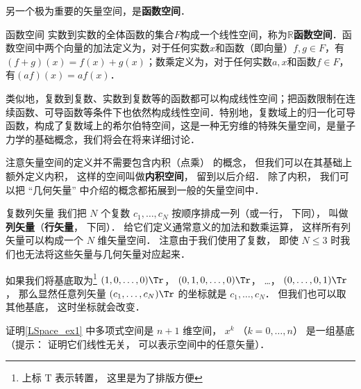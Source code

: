 另一个极为重要的矢量空间，是\textbf{函数空间}．

\begin{example}{函数空间}
实数到实数的全体函数的集合$F$构成一个线性空间，称为$\mathbb{R}$\textbf{函数空间}．函数空间中两个向量的加法定义为，对于任何实数$x$和函数（即向量）$f, g\in F$，有$(f+g)(x)=f(x)+g(x)$；数乘定义为，对于任何实数$a, x$和函数$f\in F$，有$(af)(x)=af(x)$．

类似地，复数到复数、实数到复数等的函数都可以构成线性空间；把函数限制在连续函数、可导函数等条件下也依然构成线性空间．特别地，复数域上的归一化可导函数，构成了复数域上的希尔伯特空间，这是一种无穷维的特殊矢量空间，是量子力学的基础概念，我们将会在将来详细讨论．
\end{example}

注意矢量空间的定义并不需要包含内积（点乘） 的概念， 但我们可以在其基础上额外定义内积， 这样的空间叫做\textbf{内积空间}， 留到以后介绍． 除了内积， 我们可以把 “几何矢量” 中介绍的概念都拓展到一般的矢量空间中．

\begin{exercise}{复数列矢量}
我们把 $N$ 个复数 $c_1, \dots, c_N$ 按顺序排成一列（或一行， 下同）， 叫做\textbf{列矢量}（\textbf{行矢量}， 下同）． 给它们定义通常意义的加法和数乘运算， 这样所有列矢量可以构成一个 $N$ 维矢量空间． 注意由于我们使用了复数， 即使 $N \leqslant 3$ 时我们也无法将这些矢量与几何矢量对应起来．

如果我们将基底取为\footnote{上标 $\mathrm T$ 表示转置， 这里是为了排版方便} $(1, 0, \dots, 0)\Tr$， $(0, 1, 0, \dots, 0)\Tr$， …， $(0, \dots, 0, 1)\Tr$， 那么显然任意列矢量 $(c_1, \dots, c_N)\Tr$ 的坐标就是 $c_1, \dots, c_N$． 但我们也可以取其他基底， 这时坐标就会改变．
\end{exercise}

\begin{exercise}{}
证明\autoref{LSpace_ex1} 中多项式空间是 $n+1$ 维空间， $x^k$ （$k = 0, \dots, n$） 是一组基底（提示： 证明它们线性无关， 可以表示空间中的任意矢量）．
\end{exercise}
